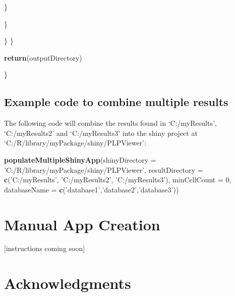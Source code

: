\documentclass[
]{article}
\newenvironment{Shaded}{\begin{snugshade}}{\end{snugshade}}
\newcommand{\DataTypeTok}[1]{\textcolor[rgb]{0.13,0.29,0.53}{#1}}
\newcommand{\DecValTok}[1]{\textcolor[rgb]{0.00,0.00,0.81}{#1}}
\newcommand{\KeywordTok}[1]{\textcolor[rgb]{0.13,0.29,0.53}{\textbf{#1}}}
\newcommand{\NormalTok}[1]{#1}
\newcommand{\StringTok}[1]{\textcolor[rgb]{0.31,0.60,0.02}{#1}}
\begin{document}
\begin{Shaded}
\begin{Highlighting}[]
\NormalTok{      \}}
      
\NormalTok{    \}}
    
\NormalTok{  \}}
\NormalTok{  \}}
  
  \KeywordTok{return}\NormalTok{(outputDirectory)}
  
\NormalTok{\}}
\end{Highlighting}
\end{Shaded}

\hypertarget{example-code-to-combine-multiple-results}{%
\subsection{Example code to combine multiple
results}\label{example-code-to-combine-multiple-results}}

The following code will combine the results found in `C:/myResults',
`C:/myResults2' and `C:/myResults3' into the shiny project at
`C:/R/library/myPackage/shiny/PLPViewer':

\begin{Shaded}
\begin{Highlighting}[]
\KeywordTok{populateMultipleShinyApp}\NormalTok{(}\DataTypeTok{shinyDirectory =} \StringTok{'C:/R/library/myPackage/shiny/PLPViewer'}\NormalTok{,}
                                     \DataTypeTok{resultDirectory =} \KeywordTok{c}\NormalTok{(}\StringTok{'C:/myResults'}\NormalTok{,}
                                                         \StringTok{'C:/myResults2'}\NormalTok{,}
                                                         \StringTok{'C:/myResults3'}\NormalTok{),}
                                     \DataTypeTok{minCellCount =} \DecValTok{0}\NormalTok{,}
                                     \DataTypeTok{databaseName =} \KeywordTok{c}\NormalTok{(}\StringTok{'database1'}\NormalTok{,}\StringTok{'database2'}\NormalTok{,}\StringTok{'database3'}\NormalTok{))}
\end{Highlighting}
\end{Shaded}

\hypertarget{manual-app-creation}{%
\section{Manual App Creation}\label{manual-app-creation}}

{[}instructions coming soon{]}

\hypertarget{acknowledgments}{%
\section{Acknowledgments}\label{acknowledgments}}
\end{document}
